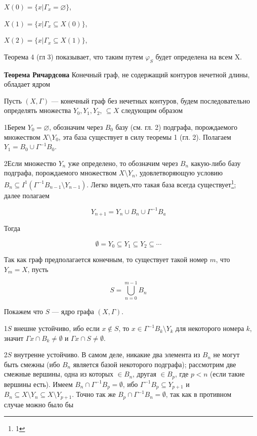 $X(0) = \{x | \Gamma_x = \varnothing\}$,

$X(1) = \{x | \Gamma_x \subseteq X(0)\}$,

$X(2) = \{x | \Gamma_x \subseteq X(1)\}$,

Теорема 4 (гл 3) показывает, что таким путем $\varphi_S$  будет определена на всем X.

\textbf{Теорема Ричардсона}  Конечный граф, не содержащий контуров нечетной длины, обладает ядром

Пусть $(X, \Gamma)$  — конечный граф без нечетных контуров, будем последовательно определять множества $Y_0, Y_1, Y_2$, $\subseteq X$  следующим образом

1\textdegree Берем $Y_0 = \varnothing$,  обозначим через $B_0$  базу (см. гл. 2) подграфа, порождаемого множеством  $X \setminus Y_0$,  эта база существует в силу теоремы 1 (гл. 2). Полагаем $Y_1 = B_0 \cup \Gamma^{-1} B_0$.

2\textdegree  Если множество $Y_n$  уже определено, то обозначим через  $B_n$  какую-либо базу подграфа, порождаемого множеством $X \setminus Y_n$,  удовлетворяющую условию $B_n \subseteq I^1 (\Gamma^{-1} B_{n-1} \setminus Y_{n-1})$.  Легко видеть,что такая база всегда существует\footnote{1}; далее полагаем

\[
Y_{n+1} = Y_n \cup B_n \cup \Gamma^{-1} B_a
\]

Тогда

\[
\emptyset = Y_0 \subseteq Y_1 \subseteq Y_2 \subseteq \cdots
\]

Так как граф предполагается конечным, то существует такой номер $m$, что $Y_m = X$, пусть

\[
S = \bigcup_{n=0}^{m-1} B_n
\]

Покажем что $S$ — ядро графа $(X, \Gamma)$.

1\textdegree $S$ внешне устойчиво, ибо если $x \notin S$, то $x \in \Gamma^{-1} B_k \setminus Y_k$ для некоторого номера $k$, значит $\Gamma x \cap B_k \neq \emptyset$ и $\Gamma x \cap S \neq \emptyset$.

2\textdegree $S$ внутренне устойчиво. В самом деле, никакие два элемента из $B_n$ не могут быть смежны (ибо $B_n$ является базой некоторого подграфа); рассмотрим две смежные вершины, одна из которых $\in B_n$, другая $\in B_p$, где $p < n$ (если такие вершины есть). Имеем $B_n \cap \Gamma^{-1} B_p = \emptyset$, ибо $\Gamma^{-1} B_p \subseteq Y_{p+1}$ и $B_n \subseteq X \setminus Y_n \subseteq X \setminus Y_{p+1}$. Точно так же $B_p \cap \Gamma^{-1} B_n = \emptyset$, так как в противном случае можно было бы

